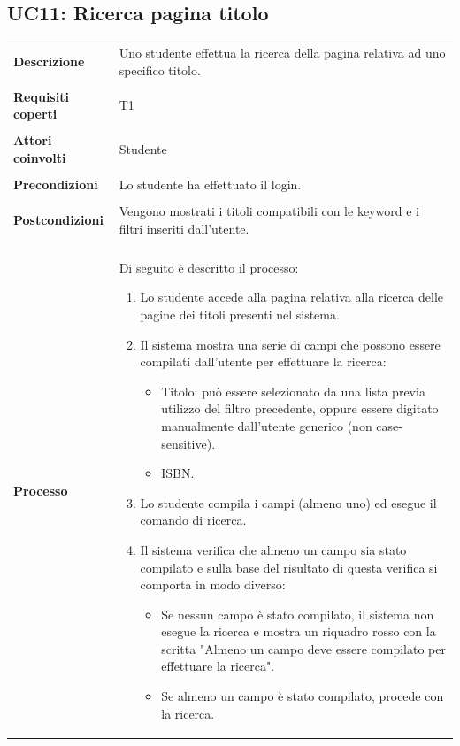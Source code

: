 \documentclass[10pt,a4paper]{report}
\begin{document}
	\subsection{UC11: Ricerca pagina titolo}
	\begin{tabular}{lp{}}
		\textbf{Descrizione}&Uno studente effettua la ricerca della pagina relativa ad uno specifico titolo.\\
		\\
		\textbf{Requisiti coperti}&T1\\
		\\
		\textbf{Attori coinvolti}&Studente\\
		\\
		\textbf{Precondizioni}&Lo studente ha effettuato il login.\\
		\\
		\textbf{Postcondizioni}&Vengono mostrati i titoli compatibili con le keyword e i filtri inseriti dall'utente.\\
		\\
		\textbf{Processo}&Di seguito è descritto il processo:
		\begin{enumerate}
			\item Lo studente accede alla pagina relativa alla ricerca delle pagine dei titoli presenti nel sistema.
			\item Il sistema mostra una serie di campi che possono essere compilati dall'utente per effettuare la ricerca:
			\begin{itemize}
				\item Titolo: può essere selezionato da una lista previa utilizzo del filtro precedente, oppure essere digitato manualmente dall'utente generico (non case-sensitive).
				\item ISBN.			
			\end{itemize}
			\item Lo studente compila i campi (almeno uno) ed esegue il comando di ricerca.
			\item Il sistema verifica che almeno un campo sia stato compilato e sulla base del risultato di questa verifica si comporta in modo diverso:
			\begin{itemize}
				\item Se nessun campo è stato compilato, il sistema non esegue la ricerca e mostra un riquadro rosso con la scritta "Almeno un campo deve essere compilato per effettuare la ricerca".
				\item Se almeno un campo è stato compilato, procede con la ricerca.
			\end{itemize}

\end{enumerate}
\end{tabular}
\end{document}
